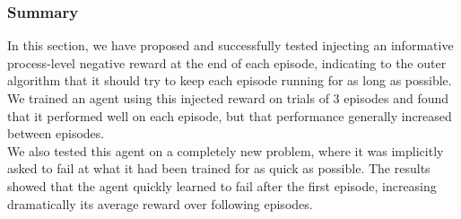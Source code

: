 \subsubsection{Summary}
In this section, we have proposed and successfully tested injecting an
informative process-level negative reward at the end of each episode, 
indicating to the outer algorithm that it should try to keep each episode
running for as long as possible. We trained an agent using this injected
reward on trials of 3 episodes and found that it performed well on each
episode, but that performance generally increased between episodes.\\

We also tested this agent on a completely new problem, where it was implicitly
asked to fail at what it had been trained for as quick as possible. The results
showed that the agent quickly learned to fail after the first episode, increasing
dramatically its average reward over following episodes.





